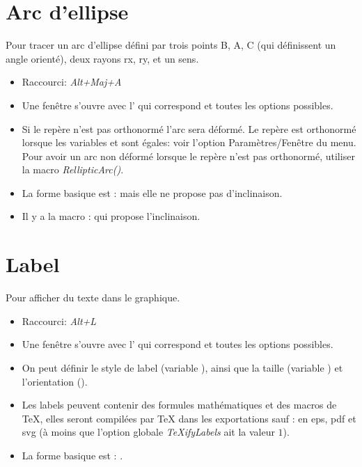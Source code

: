 \section{Arc d'ellipse}

Pour tracer un arc d'ellipse défini par trois points B, A, C (qui définissent un angle orienté), deux rayons rx, ry, et un sens.

\begin{itemize}
\item Raccourci: \textsl{Alt+Maj+A}
\item Une fenêtre s'ouvre avec l' qui correspond et toutes les options possibles.
\item Si le repère n'est pas orthonormé l'arc sera déformé. Le repère est orthonormé  lorsque les variables  et  sont égales: voir l'option Paramètres/Fenêtre du menu. Pour avoir un arc non déformé lorsque le repère n'est pas orthonormé, utiliser la macro \textsl{RellipticArc()}.
\item La forme basique est :  mais elle ne propose pas d'inclinaison.
\item Il y a la macro :  qui propose l'inclinaison.
\end{itemize}

\section{Label}

Pour afficher du texte dans le graphique.

\begin{itemize}
\item Raccourci: \textsl{Alt+L}
\item Une fenêtre s'ouvre avec l' qui correspond et toutes les options possibles.
\item On peut définir le style de label (variable ), ainsi que la taille (variable ) et l'orientation ().
\item Les labels peuvent contenir des formules mathématiques et des macros de \TeX, elles seront compilées par \TeX{} dans les exportations sauf : en eps, pdf et svg (à moins que l'option globale \emph{TeXifyLabels} ait la valeur $1$).
\item La forme basique est : .
\end{itemize}

